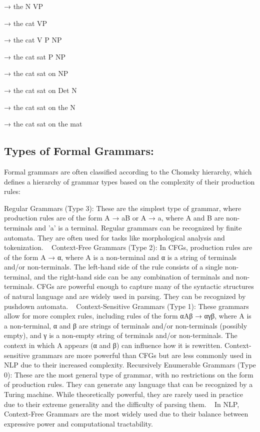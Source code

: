 	→ the N VP
	
	→ the cat VP
	
	→ the cat V P NP
	
	→ the cat sat P NP
	
	→ the cat sat on NP
	
	→ the cat sat on Det N
	
	→ the cat sat on the N
	
	→ the cat sat on the mat   
	
	\subsection{Types of Formal Grammars:}
	
	Formal grammars are often classified according to the Chomsky hierarchy, which defines a hierarchy of grammar types based on the complexity of their production rules:   
	
	Regular Grammars (Type 3): These are the simplest type of grammar, where production rules are of the form A → aB or A → a, where A and B are non-terminals and 'a' is a terminal. Regular grammars can be recognized by finite automata. They are often used for tasks like morphological analysis and tokenization.   
	Context-Free Grammars (Type 2): In CFGs, production rules are of the form A → α, where A is a non-terminal and α is a string of terminals and/or non-terminals. The left-hand side of the rule consists of a single non-terminal, and the right-hand side can be any combination of terminals and non-terminals. CFGs are powerful enough to capture many of the syntactic structures of natural language and are widely used in parsing. They can be recognized by pushdown automata.   
	Context-Sensitive Grammars (Type 1): These grammars allow for more complex rules, including rules of the form αAβ → αγβ, where A is a non-terminal, α and β are strings of terminals and/or non-terminals (possibly empty), and γ is a non-empty string of terminals and/or non-terminals. The context in which A appears (α and β) can influence how it is rewritten. Context-sensitive grammars are more powerful than CFGs but are less commonly used in NLP due to their increased complexity.
	Recursively Enumerable Grammars (Type 0): These are the most general type of grammar, with no restrictions on the form of production rules. They can generate any language that can be recognized by a Turing machine. While theoretically powerful, they are rarely used in practice due to their extreme generality and the difficulty of parsing them.   
	In NLP, Context-Free Grammars are the most widely used due to their balance between expressive power and computational tractability.
	
